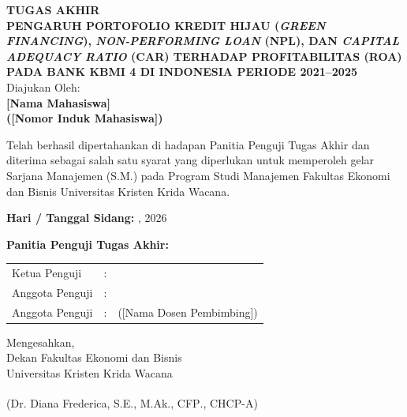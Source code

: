 \documentclass[12pt,a4paper]{article}
\newcommand{\ukrida}{Universitas Kristen Krida Wacana}
\newcommand{\nahamahasiswa}{[Nama Mahasiswa]}
\newcommand{\nim}{[Nomor Induk Mahasiswa]}
\newcommand{\dosbim}{[Nama Dosen Pembimbing]}
\newcommand{\dekan}{Dr. Diana Frederica, S.E., M.Ak., CFP\textsuperscript{\textregistered}., CHCP-A}
\numberwithin{equation}{section}
\begin{document}
\newpage
\thispagestyle{frontmatter}
\begin{center}
  {\large\bfseries TUGAS AKHIR}\\[0.6cm]
  {\large\bfseries
    PENGARUH PORTOFOLIO KREDIT HIJAU (\emph{GREEN FINANCING}),
    \emph{NON-PERFORMING LOAN} (NPL), DAN
    \emph{CAPITAL ADEQUACY RATIO} (CAR)
    TERHADAP PROFITABILITAS (ROA) PADA BANK KBMI 4
    DI INDONESIA PERIODE 2021--2025
  }\\[0.6cm]
  {\normalsize Diajukan Oleh:}\\[0.3cm]
  {\large\bfseries \nahamahasiswa}\\[0.2cm]
  {\large\bfseries (\nim)}
\end{center}

\vspace{0.4cm}
\noindent
Telah berhasil dipertahankan di hadapan Panitia Penguji Tugas Akhir dan diterima sebagai salah satu syarat yang diperlukan untuk memperoleh gelar Sarjana Manajemen (S.M.) pada Program Studi Manajemen Fakultas Ekonomi dan Bisnis Universitas Kristen Krida Wacana.

\vspace{0.4cm}
\noindent \textbf{Hari / Tanggal Sidang:} \underline{\hspace{4cm}}, \underline{\hspace{3cm}} 2026

\vspace{0.4cm}
\noindent \textbf{Panitia Penguji Tugas Akhir:}

\vspace{0.3cm}
\noindent
\begin{tabular}{lll}
  Ketua Penguji   & : & \underline{\hspace{6cm}} \\[1.5cm]
  Anggota Penguji & : & \underline{\hspace{6cm}} \\[1.5cm]
  Anggota Penguji & : & (\dosbim) \\
\end{tabular}

\vspace{0.8cm}
\noindent Mengesahkan,\\
Dekan Fakultas Ekonomi dan Bisnis\\
\ukrida

\vspace{2.2cm}
\noindent (\dekan)
\end{document}
